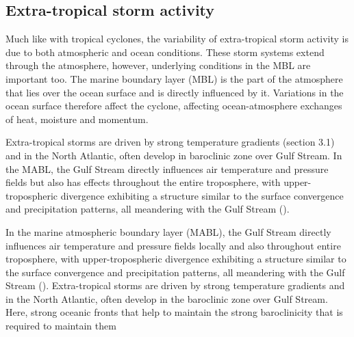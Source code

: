 
\subsection {Extra-tropical storm activity} %
%
Much like with tropical cyclones, the variability of extra-tropical storm activity is due to both atmospheric and ocean conditions. These storm systems extend through the atmosphere, however, underlying conditions in the MBL are important too. The marine boundary layer (MBL) is the part of the atmosphere that lies over the ocean surface and is directly influenced by it.  Variations in the ocean surface therefore affect the cyclone, affecting ocean-atmosphere exchanges of heat, moisture and momentum.


Extra-tropical storms are driven by strong temperature gradients (section 3.1) and in the North Atlantic, often develop in baroclinic zone over Gulf Stream. In the MABL, the Gulf Stream directly influences air temperature and pressure fields but also has effects throughout the entire troposphere, with upper-tropospheric divergence exhibiting a structure similar to the surface convergence and precipitation patterns, all meandering with the Gulf Stream (\citep{minobe2008influence}).

In the marine atmospheric boundary layer (MABL), the Gulf Stream directly influences air temperature and pressure fields locally and also throughout entire troposphere, with upper-tropospheric divergence exhibiting a structure similar to the surface convergence and precipitation patterns, all meandering with the Gulf Stream (\cite{minobe2008influence}). Extra-tropical storms are driven by strong temperature gradients and in the North Atlantic, often develop in the baroclinic zone over Gulf Stream. Here, strong oceanic fronts that help to maintain the strong baroclinicity that is required to maintain them \citep{nakamura2004observed, nakamura2008importance, hoskins1990existence}

